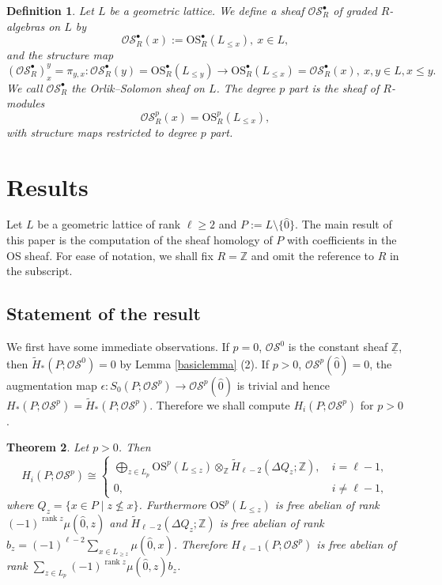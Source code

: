 \documentclass[10pt,a4paper]{amsart}
\numberwithin{equation}{section}
\newtheorem{thm}{Theorem}[section]
\newtheorem{defn}[thm]{Definition}
\numberwithin{equation}{section}
\newcommand{\Z}{\mathbb{Z}}
\newcommand{\OS}{\mathrm{OS}}
\newcommand{\sOS}{\mathscr{OS}}
\DeclareMathOperator{\rank}{rank}
\begin{document}
\begin{defn}
    Let $L$ be a geometric lattice. We define a sheaf $\sOS_R^{\bullet}$ of graded $R$-algebras on $L$ by
    \[
    \sOS_R^{\bullet}(x):=\OS_R^\bullet(L_{\leq x}), ~x\in L,
    \]
    and the structure map
    \[
    (\sOS_R^\bullet)^y_x=\pi_{y,x}: \sOS_R^\bullet(y)=\OS_R^\bullet(L_{\leq y})\to\OS_R^\bullet(L_{\leq x})=\sOS_R^\bullet(x), ~x,y\in L, x\leq y.
    \]
    We call $\sOS_R^\bullet$ the Orlik--Solomon sheaf on $L$. The degree $p$ part is the sheaf of $R$-modules
    \[
    \sOS_R^p(x)=\OS_R^p(L_{\leq x}),
    \]
    with structure maps restricted to degree $p$ part.
\end{defn}


\section{Results}
Let $L$ be a geometric lattice of rank $\ell\geq 2$ and $P:=L\setminus\{\hat{0}\}$. The main result of this paper is the computation of the sheaf homology of $P$ with coefficients in the OS sheaf. For ease of notation, we shall fix $R=\Z$ and omit the reference to $R$ in the subscript.


\subsection{Statement of the result}


We first have some immediate observations. 
If $p=0$, $\sOS^0$ is the constant sheaf $\underline{\Z}$, then $\widetilde{H}_*(P;\sOS^0)=0$ by Lemma \ref{basiclemma} (2). 
If $p>0$, $\sOS^p(\hat{0})=0$, the augmentation map $\epsilon: S_0(P;\sOS^p)\to \sOS^p(\hat{0})$ is trivial and hence $H_*(P;\sOS^p)=\widetilde{H}_*(P;\sOS^p)$. 
Therefore we shall compute $H_i(P;\sOS^p)$ for $p>0$.

\begin{thm}\label{main}
    Let $p>0$. Then
    \[
    H_i(P;\sOS^p)\cong \begin{cases}
        \bigoplus_{z\in L_p}\OS^p(L_{\leq z})\otimes_{\Z}\widetilde{H}_{\ell-2}(\Delta Q_z;\Z),~&i=\ell-1,\\
        0,& i\neq \ell-1,
    \end{cases}
    \]
    where $Q_z=\{x\in P\mid z\not\leq x\}$. Furthermore $\OS^p(L_{\leq z})$ is free abelian of rank $(-1)^{\rank z}\mu(\hat{0},z)$ and $\widetilde{H}_{\ell-2}(\Delta Q_z;\Z)$ is free abelian of rank $b_z=(-1)^{\ell-2}\sum_{x\in L_{\geq z}}\mu(\hat{0},x)$. Therefore $H_{\ell-1}(P;\sOS^p)$ is free abelian of rank $\sum_{z\in L_p}(-1)^{\rank z}\mu(\hat{0},z)b_z$.
\end{thm}
\end{document}
